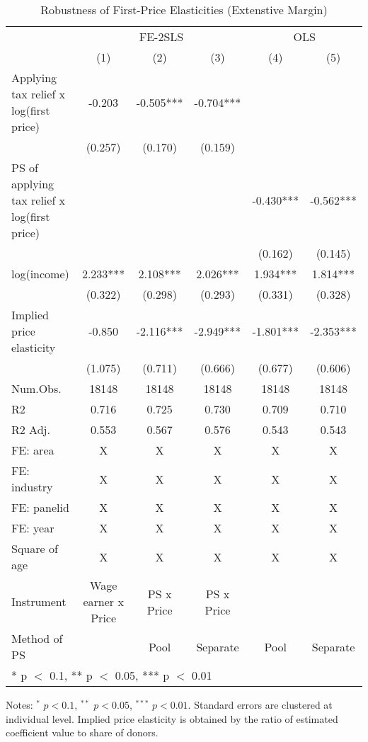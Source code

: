 \documentclass[
  11pt,
  a4paper,
]{article}
\begin{document}
\begin{table}

\caption{\label{tab:robextensive}Robustness of First-Price Elasticities (Extenstive Margin)}
\centering
\fontsize{9}{11}\selectfont
\begin{threeparttable}
\begin{tabular}[t]{lccccc}
\toprule
\multicolumn{1}{c}{ } & \multicolumn{3}{c}{FE-2SLS} & \multicolumn{2}{c}{OLS} \\
\cmidrule(l{3pt}r{3pt}){2-4} \cmidrule(l{3pt}r{3pt}){5-6}
  & (1) & (2) & (3) & (4) & (5)\\
\midrule
Applying tax relief x log(first price) & -0.203 & -0.505*** & -0.704*** &  & \\
 & (0.257) & (0.170) & (0.159) &  & \\
PS of applying tax relief x log(first price) &  &  &  & -0.430*** & -0.562***\\
 &  &  &  & (0.162) & (0.145)\\
log(income) & 2.233*** & 2.108*** & 2.026*** & 1.934*** & 1.814***\\
 & (0.322) & (0.298) & (0.293) & (0.331) & (0.328)\\
\midrule
Implied price elasticity & -0.850 & -2.116*** & -2.949*** & -1.801*** & -2.353***\\
 & (1.075) & (0.711) & (0.666) & (0.677) & (0.606)\\
Num.Obs. & 18148 & 18148 & 18148 & 18148 & 18148\\
R2 & 0.716 & 0.725 & 0.730 & 0.709 & 0.710\\
R2 Adj. & 0.553 & 0.567 & 0.576 & 0.543 & 0.543\\
FE: area & X & X & X & X & X\\
FE: industry & X & X & X & X & X\\
FE: panelid & X & X & X & X & X\\
FE: year & X & X & X & X & X\\
Square of age & X & X & X & X & X\\
Instrument & Wage earner x Price & PS x Price & PS x Price &  & \\
Method of PS &  & Pool & Separate & Pool & Separate\\
\bottomrule
\multicolumn{6}{l}{\rule{0pt}{1em}* p $<$ 0.1, ** p $<$ 0.05, *** p $<$ 0.01}\\
\end{tabular}
\begin{tablenotes}
\item Notes: $^{*}$ $p < 0.1$, $^{**}$ $p < 0.05$, $^{***}$ $p < 0.01$. Standard errors are clustered at individual level. Implied price elasticity is obtained by the ratio of estimated coefficient value to share of donors.
\end{tablenotes}
\end{threeparttable}
\end{table}
\end{document}
